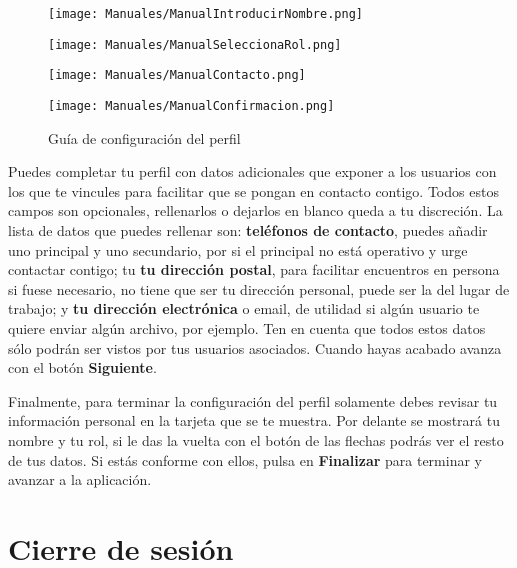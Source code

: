 \begin{figure}[H]
    \centering
    \begin{minipage}{0.20\textwidth}
        \centering
        \texttt{[image: Manuales/ManualIntroducirNombre.png]}
    \end{minipage}\hfill
    \begin{minipage}{0.20\textwidth}
        \centering
        \texttt{[image: Manuales/ManualSeleccionaRol.png]}
    \end{minipage}\hfill
    \begin{minipage}{0.20\textwidth}
        \centering
        \texttt{[image: Manuales/ManualContacto.png]}
    \end{minipage}\hfill
    \begin{minipage}{0.20\textwidth}
        \centering
        \texttt{[image: Manuales/ManualConfirmacion.png]}
    \end{minipage}\hfill
    \caption{Guía de configuración del perfil}
    \label{man:crear_usuario}
\end{figure}

Puedes completar tu perfil con datos adicionales que exponer a los usuarios con los que te vincules para facilitar que se pongan en contacto contigo. Todos estos campos son opcionales, rellenarlos o dejarlos en blanco queda a tu discreción. La lista de datos que puedes rellenar son: \textbf{teléfonos de contacto}, puedes añadir uno principal y uno secundario, por si el principal no está operativo y urge contactar contigo; tu \textbf{tu dirección postal}, para facilitar encuentros en persona si fuese necesario, no tiene que ser tu dirección personal, puede ser la del lugar de trabajo; y \textbf{tu dirección electrónica} o email, de utilidad si algún usuario te quiere enviar algún archivo, por ejemplo. Ten en cuenta que todos estos datos sólo podrán ser vistos por tus usuarios asociados. Cuando hayas acabado avanza con el botón \textbf{Siguiente}.

Finalmente, para terminar la configuración del perfil solamente debes revisar tu información personal en la tarjeta que se te muestra. Por delante se mostrará tu nombre y tu rol, si le das la vuelta con el botón de las flechas podrás ver el resto de tus datos. Si estás conforme con ellos, pulsa en \textbf{Finalizar} para terminar  y avanzar a la aplicación.

\section{Cierre de sesión}

